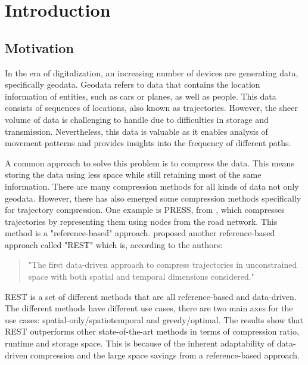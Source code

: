 \chapter{Introduction}
\section{Motivation}

In the era of digitalization, an increasing number of devices are generating data, specifically geodata. Geodata refers to data that contains the location information of entities, such as cars or planes, as well as people. This data consists of sequences of locations, also known as trajectories. However, the sheer volume of data is challenging to handle due to difficulties in storage and transmission. Nevertheless, this data is valuable as it enables analysis of movement patterns and provides insights into the frequency of different paths.

A common approach to solve this problem is to compress the data. This means storing the data using less space while still retaining most of the same information. There are many compression methods for all kinds of data not only geodata. However, there has also emerged some compression methods specifically for trajectory compression. One example is PRESS, from \textcite{song2014press}, which compresses trajectories by representing them using nodes from the road network. This method is a "reference-based" approach. \textcite{zhao2018rest} proposed another reference-based approach called "REST" which is, according to the authors:
\begin{quote}
    "The first data-driven approach to compress trajectories in unconstrained space with both spatial and temporal dimensions considered."
\end{quote}
REST is a set of different methods that are all reference-based and data-driven. The different methods have different use cases, there are two main axes for the use cases: spatial-only/spatiotemporal and greedy/optimal. The results show that REST outperforms other state-of-the-art methods in terms of compression ratio, runtime and storage space. This is because of the inherent adaptability of data-driven compression and the large space savings from a reference-based approach.

